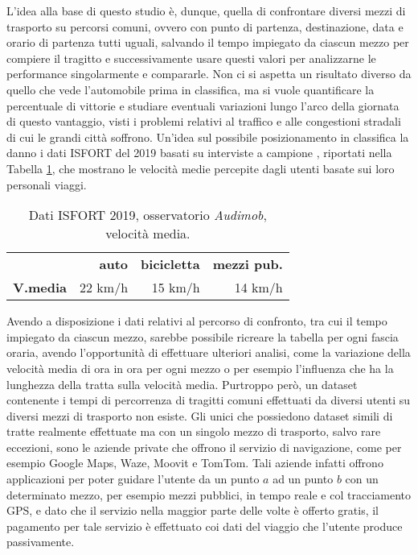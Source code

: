 L'idea alla base di questo studio è, dunque, quella di confrontare diversi mezzi di trasporto su percorsi comuni, ovvero con punto di partenza, destinazione, data e orario di partenza tutti uguali, salvando il tempo impiegato da ciascun mezzo per compiere il tragitto e successivamente usare questi valori per analizzarne le performance singolarmente e compararle. Non ci si aspetta un risultato diverso da quello che vede l'automobile prima in classifica, ma si vuole quantificare la percentuale di vittorie e studiare eventuali variazioni lungo l'arco della giornata di questo vantaggio, visti i problemi relativi al traffico e alle congestioni stradali di cui le grandi città soffrono. Un'idea sul possibile posizionamento in classifica la danno i dati ISFORT del 2019 basati su interviste a campione \cite{isfortaudimob}, riportati nella Tabella \ref{table:9}, che mostrano le velocità medie percepite dagli utenti basate sui loro personali viaggi.

\begin{table}[H]
	\centering
	\begin{tabular}{ | l  r  r r | }
		\hline
		& \textbf{auto} & \textbf{bicicletta} & \textbf{mezzi pub.} \\
		\textbf{V.media} & 22 km/h & 15 km/h & 14 km/h \\
		\hline
	\end{tabular}
	\caption{Dati ISFORT 2019, osservatorio \textit{Audimob}, velocità media.}
	\label{table:9}
\end{table}

Avendo a disposizione i dati relativi al percorso di confronto, tra cui il tempo impiegato da ciascun mezzo, sarebbe possibile ricreare la tabella per ogni fascia oraria, avendo l'opportunità di effettuare ulteriori analisi, come la variazione della velocità media di ora in ora per ogni mezzo o per esempio l'influenza che ha la lunghezza della tratta sulla velocità media. Purtroppo però, un dataset contenente i tempi di percorrenza di tragitti comuni effettuati da diversi utenti su diversi mezzi di trasporto non esiste. Gli unici che possiedono dataset simili di tratte realmente effettuate ma con un singolo mezzo di trasporto, salvo rare eccezioni, sono le aziende private che offrono il servizio di navigazione, come per esempio Google Maps, Waze, Moovit e TomTom. Tali aziende infatti offrono applicazioni per poter guidare l'utente da un punto $a$ ad un punto $b$ con un determinato mezzo, per esempio mezzi pubblici, in tempo reale e col tracciamento GPS, e dato che il servizio nella maggior parte delle volte è offerto gratis, il pagamento per tale servizio è effettuato coi dati del viaggio che l'utente produce passivamente.

